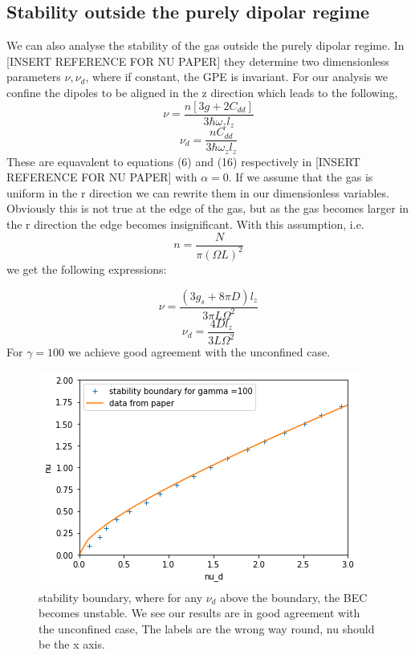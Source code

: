 \documentclass[10pt]{article}
\numberwithin{equation}{section}
\begin{document}
\begin{multicols}{2}
\section{Stability outside the purely dipolar regime}
We can also analyse the stability of the gas outside the purely dipolar regime. In [INSERT REFERENCE FOR NU PAPER] they determine two dimensionless parameters ${\nu,\nu_{d}}$, where if constant, the GPE is invariant. For our analysis we confine the dipoles to be aligned in the z direction which leads to the following,
 \begin{equation}
\nu = \frac{n[3g+2C_{dd}]}{3\hbar\omega_{z}l_{z}}
\end{equation} 
\begin{equation}
\nu_{d} = \frac{nC_{dd}}{3\hbar\omega_{z}l_{z}}
\end{equation} 
These are equavalent to equations (6) and (16) respectively in [INSERT REFERENCE FOR NU PAPER] with $\alpha=0$. If we assume that the gas is uniform in the r direction we can rewrite them in our dimensionless variables. Obviously this is not true at the edge of the gas, but as the gas becomes larger in the r direction the edge becomes insignificant. With this assumption, i.e. 
 \begin{equation}
n = \frac{N}{\pi(\Omega L)^{2}}
\end{equation} 
we get the following expressions:

 \begin{equation}
\nu = \frac{(3g_{s}+8\pi D)l_{z}}{3\pi L\Omega^{2}}
\end{equation} 
\begin{equation}
\nu_{d} = \frac{4Dl_{z}}{3L\Omega^{2}}
\end{equation} 
For $\gamma=100$ we achieve good agreement with the unconfined case.

\begin{figure}[H]
\centering
\includegraphics[width=\linewidth]{stability boundary comparison}
\caption{stability boundary, where for any $\nu_{d}$ above the boundary, the BEC becomes unstable. We see our results are in good agreement with the unconfined case, The labels are the wrong way round, nu should be the x axis.}
\end{figure}



\end{multicols}
\end{document}

